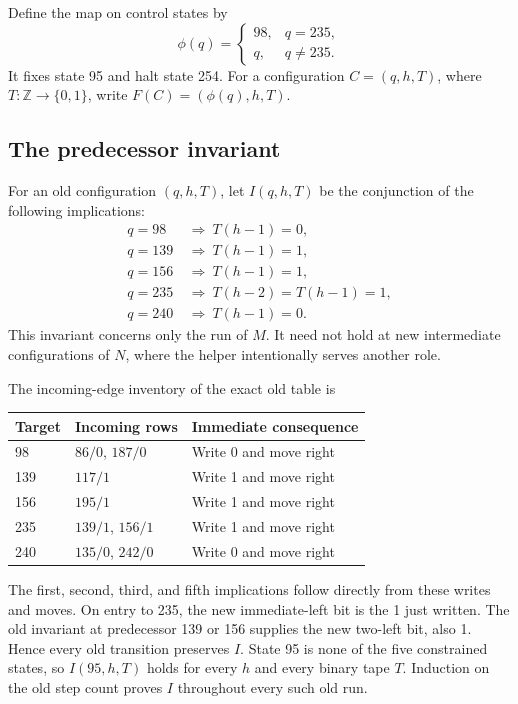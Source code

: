 Define the map on control states by
\[
 \phi(q)=\begin{cases}98,&q=235,\\q,&q\ne235.\end{cases}
\]
It fixes state 95 and halt state 254.  For a configuration
$C=(q,h,T)$, where $T:\mathbb Z\to\{0,1\}$, write
$F(C)=(\phi(q),h,T)$.

\subsection{The predecessor invariant}

For an old configuration $(q,h,T)$, let $I(q,h,T)$ be the conjunction of
the following implications:
\begin{align*}
 q=98 &\ \Longrightarrow\ T(h-1)=0,\\
 q=139 &\ \Longrightarrow\ T(h-1)=1,\\
 q=156 &\ \Longrightarrow\ T(h-1)=1,\\
 q=235 &\ \Longrightarrow\ T(h-2)=T(h-1)=1,\\
 q=240 &\ \Longrightarrow\ T(h-1)=0.
\end{align*}
This invariant concerns only the run of $M$.  It need not hold at new
intermediate configurations of $N$, where the helper intentionally serves
another role.

The incoming-edge inventory of the exact old table is
\begin{center}
\begin{tabular}{@{}lll@{}}
\toprule
Target & Incoming rows & Immediate consequence\\
\midrule
98 & $86/0$, $187/0$ & Write 0 and move right\\
139 & $117/1$ & Write 1 and move right\\
156 & $195/1$ & Write 1 and move right\\
235 & $139/1$, $156/1$ & Write 1 and move right\\
240 & $135/0$, $242/0$ & Write 0 and move right\\
\bottomrule
\end{tabular}
\end{center}
The first, second, third, and fifth implications follow directly from these
writes and moves.  On entry to 235, the new immediate-left bit is the 1 just
written.  The old invariant at predecessor 139 or 156 supplies the new
two-left bit, also 1.  Hence every old transition preserves $I$.
State 95 is none of the five constrained states, so $I(95,h,T)$ holds for
every $h$ and every binary tape $T$.  Induction on the old step count proves
$I$ throughout every such old run.

